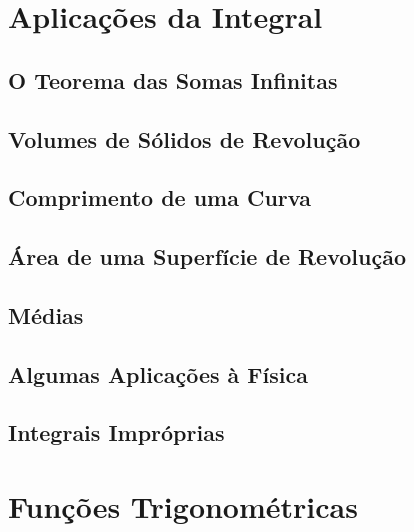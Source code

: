 \documentclass{svmono}
\begin{document}
\begin{chapterproblems}
\end{chapterproblems}

\chapter{Aplicações da Integral}
\label{chp:applint}

\section{O Teorema das Somas Infinitas}
\label{sec:infsumtheo}

\section{Volumes de Sólidos de Revolução}
\label{sec:solidrev}

\section{Comprimento de uma Curva}
\label{sec:curvelength}

\section{Área de uma Superfície de Revolução}
\label{sec:arearev}

\section{Médias}
\label{sec:averages}

\section{Algumas Aplicações à Física}
\label{sec:physics}

\section{Integrais Impróprias}
\label{sec:improperints}

\begin{chapterproblems}
\end{chapterproblems}

\chapter{Funções Trigonométricas}
\label{chp:trigfunc}
\end{document}
